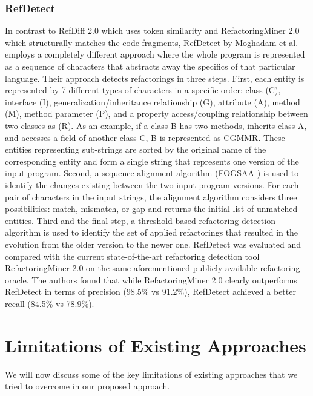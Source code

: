 \documentclass[letterpaper,12pt,onecolumn,final]{report}
\begin{document}
\subsubsection{RefDetect}
In contrast to RefDiff 2.0 \cite{Silva2020} which uses token similarity and RefactoringMiner 2.0 \cite{Tsantalis2020} which structurally matches the code fragments, RefDetect by Moghadam et al. \cite{Moghadam2021} employs a completely different approach where the whole program is represented as a sequence of characters that abstracts away the specifics of that particular language. Their approach detects refactorings in three steps. First, each entity is represented by 7 different types of characters in a specific order: class (C), interface (I), generalization/inheritance relationship (G), attribute (A), method (M), method parameter (P), and a property access/coupling relationship between two classes as (R). As an example, if a class B has two methods, inherits class A, and accesses a field of another class C, B is represented as CGMMR. These entities representing sub-strings are sorted by the original name of the corresponding entity and form a single string that represents one version of the input program. Second, a sequence alignment algorithm (FOGSAA \cite{chakraborty2013fogsaa}) is used to identify the changes existing between the two input program versions. For each pair of characters in the input strings, the alignment algorithm considers three possibilities: match, mismatch, or gap and returns the initial list of unmatched entities. Third and the final step, a threshold-based refactoring detection algorithm is used to identify the set of applied refactorings that resulted in the evolution from the older version to the newer one. RefDetect was evaluated and compared with the current state-of-the-art refactoring detection tool RefactoringMiner 2.0 on the same aforementioned publicly available refactoring oracle. The authors found that while RefactoringMiner 2.0 clearly outperforms RefDetect in terms of precision (98.5\% vs 91.2\%), RefDetect achieved a better recall (84.5\% vs 78.9\%).

\section{Limitations of Existing Approaches}

We will now discuss some of the key limitations of existing approaches that we tried to overcome in our proposed approach.
\end{document}
